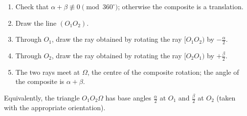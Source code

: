 \documentclass[11pt]{article}
\begin{document}
\begin{methode}
\begin{enumerate}
\item Check that $\alpha + \beta \not\equiv 0 \pmod{360^\circ}$; otherwise the composite is a translation.
\item Draw the line $(O_1O_2)$.
\item Through $O_1$, draw the ray obtained by rotating the ray $[O_1O_2)$ by $-\tfrac{\alpha}{2}$.
\item Through $O_2$, draw the ray obtained by rotating the ray $[O_2O_1)$ by $+\tfrac{\beta}{2}$.
\item The two rays meet at $\Omega$, the centre of the composite rotation; the angle of the composite is $\alpha + \beta$.
\end{enumerate}
Equivalently, the triangle $O_1O_2\Omega$ has base angles $\tfrac{\alpha}{2}$ at $O_1$ and $\tfrac{\beta}{2}$ at $O_2$ (taken with the appropriate orientation).
\end{methode}
\end{document}
